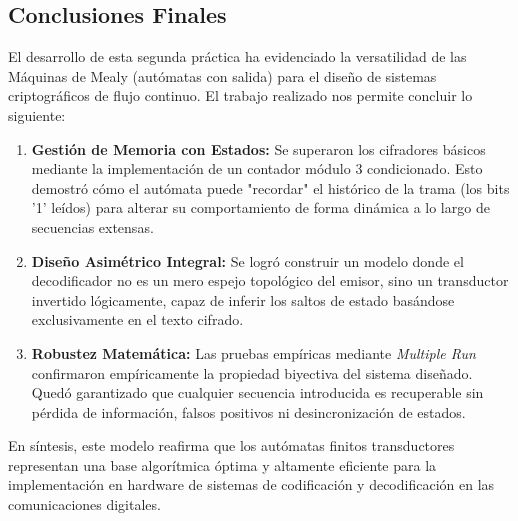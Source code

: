 \documentclass[12pt,a4paper]{article}
\begin{document}
\subsection{Conclusiones Finales}
El desarrollo de esta segunda práctica ha evidenciado la versatilidad de las Máquinas de Mealy (autómatas con salida) para el diseño de sistemas criptográficos de flujo continuo. El trabajo realizado nos permite concluir lo siguiente:
\begin{enumerate}
    \item \textbf{Gestión de Memoria con Estados:} Se superaron los cifradores básicos mediante la implementación de un contador módulo 3 condicionado. Esto demostró cómo el autómata puede "recordar" el histórico de la trama (los bits '1' leídos) para alterar su comportamiento de forma dinámica a lo largo de secuencias extensas.
    \item \textbf{Diseño Asimétrico Integral:} Se logró construir un modelo donde el decodificador no es un mero espejo topológico del emisor, sino un transductor invertido lógicamente, capaz de inferir los saltos de estado basándose exclusivamente en el texto cifrado.
    \item \textbf{Robustez Matemática:} Las pruebas empíricas mediante \textit{Multiple Run} confirmaron empíricamente la propiedad biyectiva del sistema diseñado. Quedó garantizado que cualquier secuencia introducida es recuperable sin pérdida de información, falsos positivos ni desincronización de estados.
\end{enumerate}
En síntesis, este modelo reafirma que los autómatas finitos transductores representan una base algorítmica óptima y altamente eficiente para la implementación en hardware de sistemas de codificación y decodificación en las comunicaciones digitales.
\end{document}
